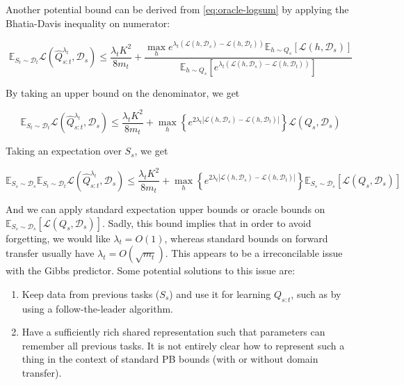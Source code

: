 \documentclass[letterpaper]{article}
\theoremstyle{definition}
\begin{document}
Another potential bound can be derived from \eqref{eq:oracle-logsum} by applying the Bhatia-Davis inequality on numerator:

$$\mathbb{E}_{S_t\sim \mathcal{D}_t}\mathcal{L}( \hat{Q}^{\lambda_t}_{s:t},\mathcal{D}_s)\leq \frac{\lambda_t K^2}{8m_t}+\frac{\max_h e^{\lambda_t(\mathcal{L}(h,\mathcal{D}_s)-\mathcal{L}(h,\mathcal{D}_t))}\mathbb{E}_{h\sim Q_s}\left [\mathcal{L}(h,\mathcal{D}_s) \right ]}{\mathbb{E}_{h\sim Q_s}\left [e^{\lambda_t(\mathcal{L}(h,\mathcal{D}_s)-\mathcal{L}(h,\mathcal{D}_t))}\right ]}$$

By taking an upper bound on the denominator, we get 

$$\mathbb{E}_{S_t\sim \mathcal{D}_t}\mathcal{L}( \hat{Q}^{\lambda_t}_{s:t},\mathcal{D}_s)\leq \frac{\lambda_t K^2}{8m_t}+\max_h \left \{ e^{2\lambda_t|\mathcal{L}(h,\mathcal{D}_s)-\mathcal{L}(h,\mathcal{D}_t)|}\right \}\mathcal{L}(Q_s,\mathcal{D}_s)$$

Taking an expectation over $S_s$, we get

\begin{equation}
\mathbb{E}_{S_s\sim \mathcal{D}_s}\mathbb{E}_{S_t\sim \mathcal{D}_t}\mathcal{L}( \hat{Q}^{\lambda_t}_{s:t},\mathcal{D}_s)\leq \frac{\lambda_t K^2}{8m_t}+\max_h \left \{ e^{2\lambda_t|\mathcal{L}(h,\mathcal{D}_s)-\mathcal{L}(h,\mathcal{D}_t)|}\right \}\mathbb{E}_{S_s\sim \mathcal{D}_s}\left [\mathcal{L}(Q_s,\mathcal{D}_s)\right ]
\end{equation}

And we can apply standard expectation upper bounds or oracle bounds on $\mathbb{E}_{S_s\sim \mathcal{D}_s}\left [\mathcal{L}(Q_s,\mathcal{D}_s)\right ]$.
Sadly, this  bound implies that in order to avoid forgetting, we would like $\lambda_t=O(1)$, whereas standard bounds on forward transfer usually have $\lambda_t=O(\sqrt{m_t})$. This appears to be a irreconcilable issue with the Gibbs predictor. Some potential solutions to this issue are:

\begin{enumerate}
	\item Keep data from previous tasks ($S_s$) and use it for learning $Q_{s:t}$, such as by using a follow-the-leader algorithm.
	\item Have a sufficiently rich shared representation such that parameters can remember all previous tasks. It is not entirely clear how to represent such a thing in the context of standard PB bounds (with or without domain transfer).
\end{enumerate} 
\end{document}

